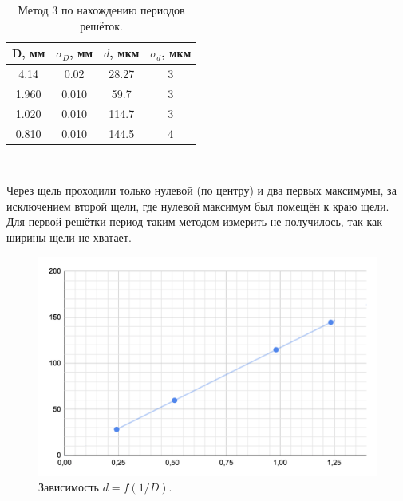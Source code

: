 \documentclass[a4paper, 12pt]{article}%
\begin{document}
\begin{table}[h]
\begin{tabular}{|c|c|c|c|}
\hline
D, мм & $\sigma_D$, мм & $d$, мкм & $\sigma_d$, мкм \\ \hline
4.14  & 0.02           & 28.27    & 3            \\ \hline
1.960 & 0.010          & 59.7     & 3             \\ \hline
1.020 & 0.010          & 114.7    & 3             \\ \hline
0.810 & 0.010          & 144.5    & 4             \\ \hline
\end{tabular}
\centering
\caption{Метод 3 по нахождению периодов решёток.}
\end{table}\\
\textbf{       }

Через щель проходили только нулевой (по центру) и два первых максимумы, за исключением второй щели, где нулевой максимум был помещён к краю щели. Для первой решётки период таким методом измерить не получилось, так как ширины щели не хватает.
\begin{figure}[h]
\includegraphics[scale=0.7]{2.png}
\centering
\caption{Зависимость $d = f(1/D)$.}
\end{figure}
\textbf{       }
\end{document}
